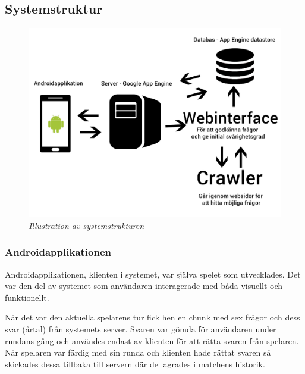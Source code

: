 \documentclass[a4paper, 11pt]{article}
\begin{document}
\subsection{Systemstruktur}

\begin{figure}[H]
	\begin{centering}
	\includegraphics[width = \textwidth]{systemstruktur.jpg} 
	\end{centering}
	\caption{\textit{Illustration av systemstrukturen}}
\end{figure} 

\subsubsection{Androidapplikationen}
Androidapplikationen, klienten i systemet, var själva spelet som utvecklades. Det var den del av systemet som användaren interagerade med båda visuellt och funktionellt.

När det var den aktuella spelarens tur fick hen en chunk med sex frågor och dess svar (årtal) från systemets server. Svaren var gömda för användaren under rundans gång och användes endast av klienten för att rätta svaren från spelaren. När spelaren var färdig med sin runda och klienten hade rättat svaren så skickades dessa tillbaka till servern där de lagrades i matchens historik. 
\end{document}
